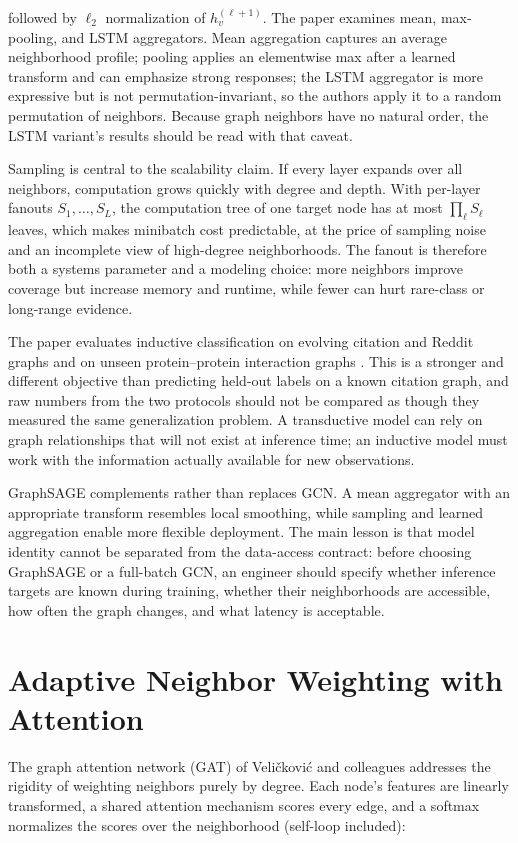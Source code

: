 \documentclass[conference]{IEEEtran}
\begin{document}
followed by \(\ell_2\) normalization of \(h_v^{(\ell+1)}\). The paper examines mean, max-pooling, and LSTM aggregators. Mean aggregation captures an average neighborhood profile; pooling applies an elementwise max after a learned transform and can emphasize strong responses; the LSTM aggregator is more expressive but is not permutation-invariant, so the authors apply it to a random permutation of neighbors. Because graph neighbors have no natural order, the LSTM variant's results should be read with that caveat.

Sampling is central to the scalability claim. If every layer expands over all neighbors, computation grows quickly with degree and depth. With per-layer fanouts \(S_1,\dots,S_L\), the computation tree of one target node has at most \(\prod_{\ell} S_\ell\) leaves, which makes minibatch cost predictable, at the price of sampling noise and an incomplete view of high-degree neighborhoods. The fanout is therefore both a systems parameter and a modeling choice: more neighbors improve coverage but increase memory and runtime, while fewer can hurt rare-class or long-range evidence.

The paper evaluates inductive classification on evolving citation and Reddit graphs and on unseen protein--protein interaction graphs \cite{b2}. This is a stronger and different objective than predicting held-out labels on a known citation graph, and raw numbers from the two protocols should not be compared as though they measured the same generalization problem. A transductive model can rely on graph relationships that will not exist at inference time; an inductive model must work with the information actually available for new observations.

GraphSAGE complements rather than replaces GCN. A mean aggregator with an appropriate transform resembles local smoothing, while sampling and learned aggregation enable more flexible deployment. The main lesson is that model identity cannot be separated from the data-access contract: before choosing GraphSAGE or a full-batch GCN, an engineer should specify whether inference targets are known during training, whether their neighborhoods are accessible, how often the graph changes, and what latency is acceptable.

\section{Adaptive Neighbor Weighting with Attention}

The graph attention network (GAT) of Veličković and colleagues \cite{b3} addresses the rigidity of weighting neighbors purely by degree. Each node's features are linearly transformed, a shared attention mechanism scores every edge, and a softmax normalizes the scores over the neighborhood (self-loop included):
\end{document}
